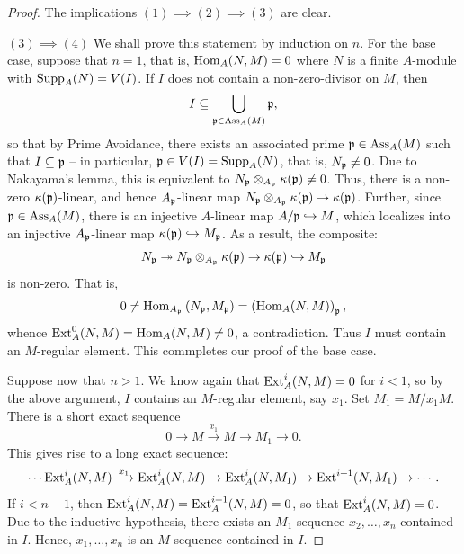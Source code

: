\begin{proof}
    The implications $(1)\implies(2)\implies(3)$ are clear. 

    \noindent$(3)\implies(4)$ We shall prove this statement by induction on $n$. For the base case, suppose that $n = 1$, that is, $\operatorname{Hom}_A(N, M) = 0$ where $N$ is a finite $A$-module with $\operatorname{Supp}_A(N) = V(I)$. If $I$ does not contain a non-zero-divisor on $M$, then 
    \begin{equation*}
        I\subseteq\bigcup_{\mathfrak{p}\in\operatorname{Ass}_A(M)}\mathfrak{p},
    \end{equation*}
    so that by Prime Avoidance, there exists an associated prime $\mathfrak{p}\in\operatorname{Ass}_A(M)$ such that $I\subseteq\mathfrak{p}$ -- in particular, $\mathfrak{p}\in V(I) = \operatorname{Supp}_A(N)$, that is, $N_{\mathfrak{p}}\ne 0$. Due to Nakayama's lemma, this is equivalent to $N_{\mathfrak{p}}\otimes_{A_{\mathfrak{p}}}\kappa(\mathfrak{p})\ne 0$. Thus, there is a non-zero $\kappa(\mathfrak{p})$-linear, and hence $A_{\mathfrak{p}}$-linear map $N_{\mathfrak{p}}\otimes_{A_{\mathfrak{p}}}\kappa(\mathfrak{p})\to\kappa(\mathfrak{p})$. Further, since $\mathfrak{p}\in\operatorname{Ass}_A(M)$, there is an injective $A$-linear map $A/\mathfrak{p}\hookrightarrow M$, which localizes into an injective $A_{\mathfrak{p}}$-linear map $\kappa(\mathfrak{p})\hookrightarrow M_{\mathfrak{p}}$. As a result, the composite: 
    \begin{equation*}
        N_{\mathfrak{p}}\twoheadrightarrow N_{\mathfrak{p}}\otimes_{A_{\mathfrak{p}}}\kappa(\mathfrak{p})\to\kappa(\mathfrak{p})\hookrightarrow M_{\mathfrak{p}}
    \end{equation*}
    is non-zero. That is, 
    \begin{equation*}
        0\ne\operatorname{Hom}_{A_{\mathfrak{p}}}\left(N_{\mathfrak{p}}, M_{\mathfrak{p}}\right) = \left(\operatorname{Hom}_A(N, M)\right)_{\mathfrak{p}},
    \end{equation*}
    whence $\operatorname{Ext}^0_A(N, M) = \operatorname{Hom}_A(N, M)\ne 0$, a contradiction. Thus $I$ must contain an $M$-regular element. This commpletes our proof of the base case. 

    Suppose now that $n > 1$. We know again that $\operatorname{Ext}^i_A(N, M) = 0$ for $i < 1$, so by the above argument, $I$ contains an $M$-regular element, say $x_1$. Set $M_1 = M/x_1 M$. There is a short exact sequence 
    \begin{equation*}
        0\to M\xrightarrow{x_1} M\to M_1\to 0.
    \end{equation*}
    This gives rise to a long exact sequence: 
    \begin{equation*}
        \cdots\operatorname{Ext}^i_A(N, M)\xrightarrow{x_1}\operatorname{Ext}^i_A(N, M)\to\operatorname{Ext}^i_A(N, M_1)\to\operatorname{Ext}^{i + 1}(N, M_1)\to \cdots.
    \end{equation*}
    If $i < n - 1$, then $\operatorname{Ext}^i_A(N, M) = \operatorname{Ext}^{i + 1}_A(N, M) = 0$, so that $\operatorname{Ext}^i_A(N, M) = 0$. Due to the inductive hypothesis, there exists an $M_1$-sequence $x_2,\dots,x_n$ contained in $I$. Hence, $x_1,\dots,x_n$ is an $M$-sequence contained in $I$.


\end{proof}
